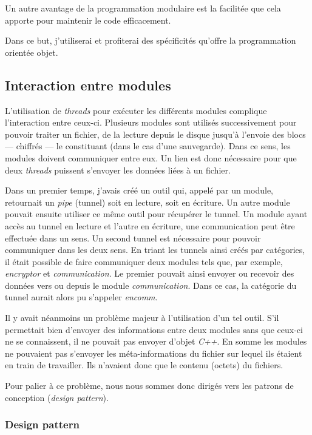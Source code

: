 \documentclass[a4paper,10pt, twoside]{report}
\begin{document}
\begin{spacing}{1.2}
Un autre avantage de la programmation modulaire est la facilitée que cela
apporte pour maintenir le code efficacement.

Dans ce but, j'utiliserai et profiterai des spécificités qu'offre la
programmation orientée objet.

\subsection{Interaction entre modules}

L'utilisation de \textit{threads} pour exécuter les différents modules
complique l'interaction entre ceux-ci. Plusieurs modules sont utilisés
successivement pour pouvoir traiter un fichier, de la lecture depuis le disque
jusqu'à l'envoie des blocs --- chiffrés --- le constituant (dans le cas d'une
sauvegarde). Dans ce sens, les modules doivent communiquer entre eux. Un lien
est donc nécessaire pour que deux \textit{threads} puissent s'envoyer les
données liées à un fichier.

Dans un premier temps, j'avais créé un outil qui, appelé par un module,
retournait un \textit{pipe} (tunnel) soit en lecture, soit en écriture. Un
autre module pouvait ensuite utiliser ce même outil pour récupérer le tunnel.
Un module ayant accès au tunnel en lecture et l'autre en écriture, une
communication peut être effectuée dans un sens. Un second tunnel est nécessaire
pour pouvoir communiquer dans les deux sens. En triant les tunnels ainsi créés
par catégories, il était possible de faire communiquer deux modules tels que,
par exemple, \textit{encryptor} et \textit{communication}. Le premier pouvait
ainsi envoyer ou recevoir des données vers ou depuis le module
\textit{communication}. Dans ce cas, la catégorie du tunnel aurait alors pu
s'appeler \textit{encomm}.

Il y avait néanmoins un problème majeur à l'utilisation d'un tel outil.
S'il permettait bien d'envoyer des informations entre deux modules sans
que ceux-ci ne se connaissent, il ne pouvait pas envoyer d'objet
\textit{C++}. En somme les modules ne pouvaient pas s'envoyer les
méta-informations du fichier sur lequel ils étaient en train de travailler.
Ils n'avaient donc que le contenu (octets) du fichiers.

Pour palier à ce problème, nous nous sommes donc dirigés vers les patrons
de conception (\textit{design pattern}).

\subsubsection{Design pattern}

\end{spacing}
\end{document}
